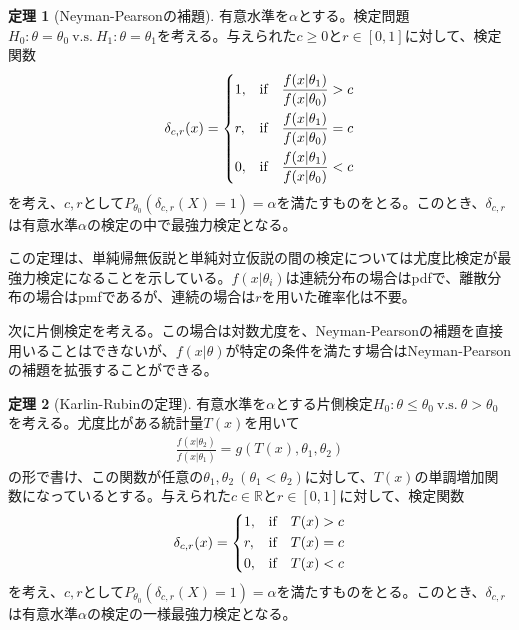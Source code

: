 \documentclass[11pt]{ltjsarticle}
\theoremstyle{definition}
\newtheorem{theorem}{定理}[section]
\newcommand{\R}{\mathbb{R}}%
\begin{document}
\begin{theorem}[Neyman-Pearsonの補題]\label{th:NeymanPearson}
    有意水準を$\alpha$とする。検定問題$H_0: \theta=\theta_0 \ \text{v.s.}\  H_1: \theta=\theta_1$を考える。与えられた$c\ge0$と$r\in[0, 1]$に対して、検定関数
    \begin{align}
        \delta_{c, r}(x) = 
        \begin{dcases}
            1, & \text{if}\quad \frac{f(x|\theta_1)}{f(x|\theta_0)}>c \\
            r, & \text{if}\quad \frac{f(x|\theta_1)}{f(x|\theta_0)}=c \\
            0, & \text{if}\quad \frac{f(x|\theta_1)}{f(x|\theta_0)}<c
        \end{dcases}
    \end{align}
    を考え、$c, r$として$P_{\theta_0}(\delta_{c, r}(X)=1)=\alpha$を満たすものをとる。このとき、$\delta_{c, r}$は有意水準$\alpha$の検定の中で最強力検定となる。
\end{theorem}

この定理は、単純帰無仮説と単純対立仮説の間の検定については尤度比検定が最強力検定になることを示している。$f(x|\theta_i)$は連続分布の場合はpdfで、離散分布の場合はpmfであるが、連続の場合は$r$を用いた確率化は不要。

次に片側検定を考える。この場合は対数尤度を、Neyman-Pearsonの補題を直接用いることはできないが、$f(x|\theta)$が特定の条件を満たす場合はNeyman-Pearsonの補題を拡張することができる。

\begin{theorem}[Karlin-Rubinの定理]
    有意水準を$\alpha$とする片側検定$H_0: \theta\le\theta_0\ \text{v.s.}\ \theta>\theta_0$を考える。尤度比がある統計量$T(x)$を用いて
    \begin{align}
        \frac{f(x|\theta_2)}{f(x|\theta_1)}=g(T(x), \theta_1, \theta_2)
    \end{align}
    の形で書け、この関数が任意の$\theta_1, \theta_2\  (\theta_1<\theta_2)$に対して、$T(x)$の単調増加関数になっているとする。与えられた$c\in\R$と$r\in[0, 1]$に対して、検定関数
    \begin{align}
        \delta_{c, r}(x) = 
        \begin{dcases}
            1, & \text{if}\quad T(x)>c \\
            r, & \text{if}\quad T(x)=c \\
            0, & \text{if}\quad T(x)<c
        \end{dcases}
    \end{align}
    を考え、$c, r$として$P_{\theta_0}(\delta_{c, r}(X)=1)=\alpha$を満たすものをとる。このとき、$\delta_{c, r}$は有意水準$\alpha$の検定の一様最強力検定となる。
\end{theorem}
\end{document}
